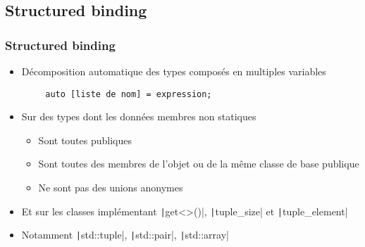 \documentclass[C++.tex]{subfiles}
\begin{document}
\subsection*{Structured binding}
\begin{frame}[fragile]
	\frametitle{Structured binding}
	\begin{itemize}
		\item Décomposition automatique des types composés en multiples variables
	\end{itemize}

	\begin{verbatim}
		auto [liste de nom] = expression;
	\end{verbatim}

	\begin{itemize}
		\item Sur des types dont les données membres non statiques
		\begin{itemize}
			\item Sont toutes publiques
			\item Sont toutes des membres de l'objet ou de la même classe de base publique
			\item Ne sont pas des unions anonymes
		\end{itemize}
		\item Et sur les classes implémentant \texttt|get<>()|, \texttt|tuple_size| et \texttt|tuple_element|
		\item Notamment \texttt|std::tuple|, \texttt|std::pair|, \texttt|std::array|
	\end{itemize}

\end{frame}
\end{document}
